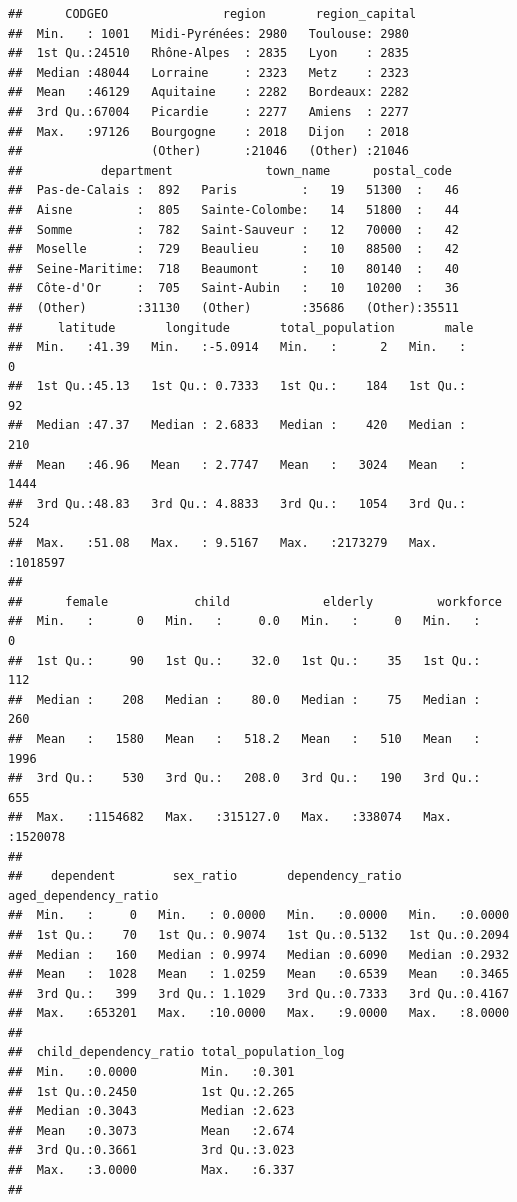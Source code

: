 \documentclass[]{article}
\begin{document}
\begin{verbatim}
##      CODGEO                region       region_capital 
##  Min.   : 1001   Midi-Pyrénées: 2980   Toulouse: 2980  
##  1st Qu.:24510   Rhône-Alpes  : 2835   Lyon    : 2835  
##  Median :48044   Lorraine     : 2323   Metz    : 2323  
##  Mean   :46129   Aquitaine    : 2282   Bordeaux: 2282  
##  3rd Qu.:67004   Picardie     : 2277   Amiens  : 2277  
##  Max.   :97126   Bourgogne    : 2018   Dijon   : 2018  
##                  (Other)      :21046   (Other) :21046  
##           department             town_name      postal_code   
##  Pas-de-Calais :  892   Paris         :   19   51300  :   46  
##  Aisne         :  805   Sainte-Colombe:   14   51800  :   44  
##  Somme         :  782   Saint-Sauveur :   12   70000  :   42  
##  Moselle       :  729   Beaulieu      :   10   88500  :   42  
##  Seine-Maritime:  718   Beaumont      :   10   80140  :   40  
##  Côte-d'Or     :  705   Saint-Aubin   :   10   10200  :   36  
##  (Other)       :31130   (Other)       :35686   (Other):35511  
##     latitude       longitude       total_population       male        
##  Min.   :41.39   Min.   :-5.0914   Min.   :      2   Min.   :      0  
##  1st Qu.:45.13   1st Qu.: 0.7333   1st Qu.:    184   1st Qu.:     92  
##  Median :47.37   Median : 2.6833   Median :    420   Median :    210  
##  Mean   :46.96   Mean   : 2.7747   Mean   :   3024   Mean   :   1444  
##  3rd Qu.:48.83   3rd Qu.: 4.8833   3rd Qu.:   1054   3rd Qu.:    524  
##  Max.   :51.08   Max.   : 9.5167   Max.   :2173279   Max.   :1018597  
##                                                                       
##      female            child             elderly         workforce      
##  Min.   :      0   Min.   :     0.0   Min.   :     0   Min.   :      0  
##  1st Qu.:     90   1st Qu.:    32.0   1st Qu.:    35   1st Qu.:    112  
##  Median :    208   Median :    80.0   Median :    75   Median :    260  
##  Mean   :   1580   Mean   :   518.2   Mean   :   510   Mean   :   1996  
##  3rd Qu.:    530   3rd Qu.:   208.0   3rd Qu.:   190   3rd Qu.:    655  
##  Max.   :1154682   Max.   :315127.0   Max.   :338074   Max.   :1520078  
##                                                                         
##    dependent        sex_ratio       dependency_ratio aged_dependency_ratio
##  Min.   :     0   Min.   : 0.0000   Min.   :0.0000   Min.   :0.0000       
##  1st Qu.:    70   1st Qu.: 0.9074   1st Qu.:0.5132   1st Qu.:0.2094       
##  Median :   160   Median : 0.9974   Median :0.6090   Median :0.2932       
##  Mean   :  1028   Mean   : 1.0259   Mean   :0.6539   Mean   :0.3465       
##  3rd Qu.:   399   3rd Qu.: 1.1029   3rd Qu.:0.7333   3rd Qu.:0.4167       
##  Max.   :653201   Max.   :10.0000   Max.   :9.0000   Max.   :8.0000       
##                                                                           
##  child_dependency_ratio total_population_log
##  Min.   :0.0000         Min.   :0.301       
##  1st Qu.:0.2450         1st Qu.:2.265       
##  Median :0.3043         Median :2.623       
##  Mean   :0.3073         Mean   :2.674       
##  3rd Qu.:0.3661         3rd Qu.:3.023       
##  Max.   :3.0000         Max.   :6.337       
## 
\end{verbatim}
\end{document}
